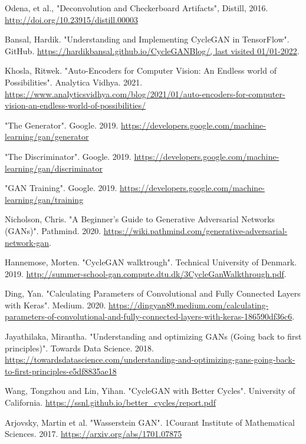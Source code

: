 \documentclass[11pt, fleqn, titlepage]{article}
\newcommand{\1}[1]{\mathds{1}\left[#1\right]}
\begin{document}
\begin{thebibliography}{9}
		 Odena, et al., "Deconvolution and Checkerboard Artifacts", Distill, 2016. \url{http://doi.org/10.23915/distill.00003}
		
		 Bansal, Hardik. "Understanding and Implementing CycleGAN in TensorFlow". GitHub. \url{https://hardikbansal.github.io/CycleGANBlog/, last visited 01/01-2022}.
		
		 Khosla, Ritwek. "Auto-Encoders for Computer Vision: An Endless world of Possibilities". Analytica Vidhya. 2021. \url{https://www.analyticsvidhya.com/blog/2021/01/auto-encoders-for-computer-vision-an-endless-world-of-possibilities/}
		
		 "The Generator". Google. 2019. \url{https://developers.google.com/machine-learning/gan/generator}
		
		 "The Discriminator". Google. 2019. \url{https://developers.google.com/machine-learning/gan/discriminator}
		
		 "GAN Training". Google. 2019. \url{https://developers.google.com/machine-learning/gan/training}
		
		 Nicholson, Chris. "A Beginner's Guide to Generative Adversarial Networks (GANs)". Pathmind. 2020. \url{https://wiki.pathmind.com/generative-adversarial-network-gan}.
		
		 Hannemose, Morten. "CycleGAN walktrough". Technical University of Denmark. 2019. \url{http://summer-school-gan.compute.dtu.dk/3CycleGanWalkthrough.pdf}.
		
		 Ding, Yan. "Calculating Parameters of Convolutional and Fully Connected Layers with Keras". Medium. 2020. \url{https://dingyan89.medium.com/calculating-parameters-of-convolutional-and-fully-connected-layers-with-keras-186590df36c6}.
		
		 Jayathilaka, Mirantha. "Understanding and optimizing GANs (Going back to first principles)". Towards Data Science. 2018. \url{https://towardsdatascience.com/understanding-and-optimizing-gans-going-back-to-first-principles-e5df8835ae18}
		
		 Wang, Tongzhou and Lin, Yihan. "CycleGAN with Better Cycles". University of California. \url{https://ssnl.github.io/better_cycles/report.pdf}
		
		 Arjovsky, Martin et al. "Wasserstein GAN". 1Courant Institute of Mathematical Sciences. 2017. \url{https://arxiv.org/abs/1701.07875}
		

\end{thebibliography}
\end{document}
